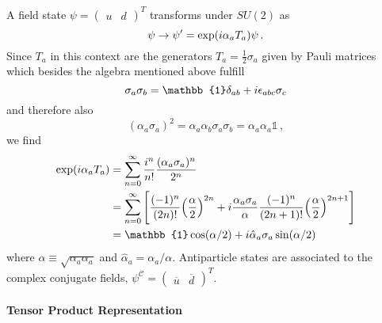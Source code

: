 A field state ${\psi=\begin{pmatrix}u&d\end{pmatrix}^T}$ transforms under $SU(2)$ as
\begin{equation}
    \psi\to\psi^\prime=\exp({i}\alpha_aT_a)\psi\,.
\end{equation}
Since $T_a$ in this context are the generators $T_a=\frac{1}{2}\sigma_a$ given by Pauli matrices which besides the algebra mentioned above fulfill
\begin{equation}
    \sigma_a\sigma_b=\mathbb{1}\delta_{ab}+\imagu\epsilon_{abc}\sigma_c
\end{equation}
and therefore also
\begin{equation}
    (\alpha_a\sigma_a)^2=\alpha_a\alpha_b\sigma_a\sigma_b=\alpha_a\alpha_a\mathbb{1}\,,
\end{equation}
we find
\begin{align}
    \exp(\imagu\alpha_aT_a)&=\sum_{n=0}^\infty\frac{\imagu^n}{n!}\frac{(\alpha_a\sigma_a)^n}{2^n}\\
    &=\sum_{n=0}^\infty\Bigg[\frac{(-1)^n}{(2n)!}\Big(\frac{\alpha}{2}\Big)^{2n}+\imagu\frac{\alpha_a\sigma_a}{\alpha}\frac{(-1)^n}{(2n+1)!}\Big(\frac{\alpha}{2}\Big)^{2n+1}\Bigg]\\
    &=\mathbb{1}\cos(\alpha/2)+\imagu\hat{\alpha}_a\sigma_a\sin(\alpha/2)
\end{align}
where $\alpha\equiv\sqrt{\alpha_a\alpha_a}$ and $\hat{\alpha}_a=\alpha_a/\alpha$. Antiparticle states are associated to the complex conjugate fields, ${\psi^\mathcal{C}=\begin{pmatrix}\overline{u}&\overline{d}\end{pmatrix}^T}$.

\paragraph{Tensor Product Representation}

